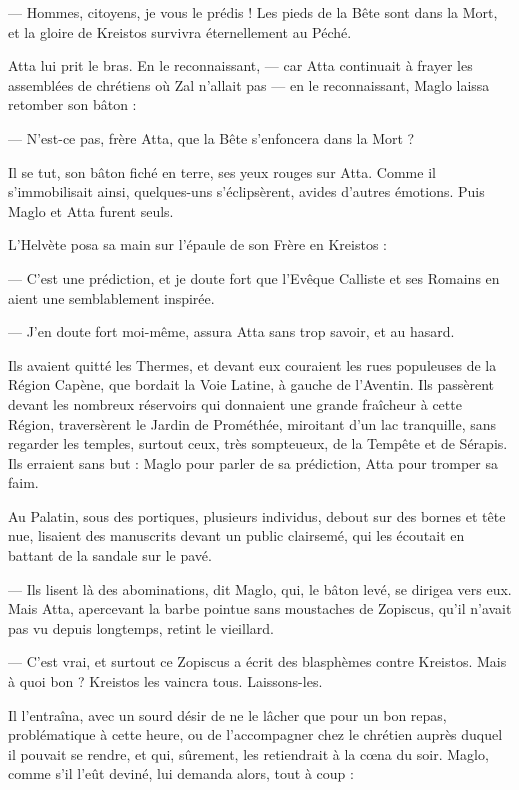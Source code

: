 \documentclass[a4paper, 11pt, oneside, polutonikogreek, french]{article}
\begin{document}
--- Hommes, citoyens, je vous le prédis ! Les pieds de la Bête sont dans la Mort, et la gloire de Kreistos survivra éternellement au Péché.

Atta lui prit le bras. En le reconnaissant, --- car Atta continuait à frayer les assemblées de chrétiens où Zal n'allait pas --- en le reconnaissant, Maglo laissa retomber son bâton :

--- N'est-ce pas, frère Atta, que la Bête s'enfoncera dans la Mort ?

Il se tut, son bâton fiché en terre, ses yeux rouges sur Atta. Comme il s'immobilisait ainsi, quelques-uns s'éclipsèrent, avides d'autres émotions. Puis Maglo et Atta furent seuls.

L'Helvète posa sa main sur l'épaule de son Frère en Kreistos :

--- C'est une prédiction, et je doute fort que l'Evêque Calliste et ses Romains en aient une semblablement inspirée.

--- J'en doute fort moi-même, assura Atta sans trop savoir, et au hasard.

Ils avaient quitté les Thermes, et devant eux couraient les rues populeuses de la Région Capène, que bordait la Voie Latine, à gauche de l'Aventin. Ils passèrent devant les nombreux réservoirs qui donnaient une grande fraîcheur à cette Région, traversèrent le Jardin de Prométhée, miroitant d'un lac tranquille, sans regarder les temples, surtout ceux, très sompteueux, de la Tempête et de Sérapis. Ils erraient sans but : Maglo pour parler de sa prédiction, Atta pour tromper sa faim.

Au Palatin, sous des portiques, plusieurs individus, debout sur des bornes et tête nue, lisaient des manuscrits devant un public clairsemé, qui les écoutait en battant de la sandale sur le pavé.

--- Ils lisent là des abominations, dit Maglo, qui, le bâton levé, se dirigea vers eux. Mais Atta, apercevant la barbe pointue sans moustaches de Zopiscus, qu'il n'avait pas vu depuis longtemps, retint le vieillard.

--- C'est vrai, et surtout ce Zopiscus a écrit des blasphèmes contre Kreistos. Mais à quoi bon ? Kreistos les vaincra tous. Laissons-les.

Il l'entraîna, avec un sourd désir de ne le lâcher que pour un bon repas, problématique à cette heure, ou de l'accompagner chez le chrétien auprès duquel il pouvait se rendre, et qui, sûrement, les retiendrait à la cœna du soir. Maglo, comme s'il l'eût deviné, lui demanda alors, tout à coup :
\end{document}
